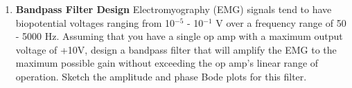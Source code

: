 \begin{enumerate}
\item {\bf Bandpass Filter Design} Electromyography (EMG) signals
tend to have biopotential voltages ranging from 10$^{-5}$ - 10$^{-1}$ V over a
frequency range of 50 - 5000 Hz.  Assuming that you have a single op amp with a
maximum output voltage of +10V, design a bandpass filter that will amplify the
EMG to the maximum possible gain without exceeding the op amp's linear range of
operation.  Sketch the amplitude and phase Bode plots for this filter.

\end{enumerate}


